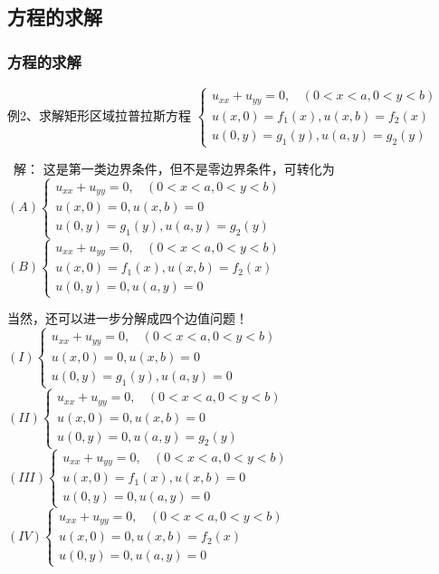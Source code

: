 \subsection{方程的求解}
\begin{frame}
	\frametitle{方程的求解}
	\begin{exampleblock} {例2、求解矩形区域拉普拉斯方程}
		$\displaystyle \begin{cases}
			u_{xx} +u_{yy} =0 ,~~~~ (0<x<a, 0<y<b)\\
			u(x,0)= f_1 (x) ,  u(x,b)= f_2 (x) \\
			u(0,y)= g_1 (y) ,  u(a,y)= g_2 (y) 
		\end{cases}$ \\
	\end{exampleblock}	
	\alert{ 解：}	这是第一类边界条件，但不是零边界条件，可转化为 \\
	$\displaystyle (A) \begin{cases}
		u_{xx} +u_{yy} =0 ,~~~~ (0<x<a, 0<y<b)\\
		u(x,0)= 0,  u(x,b)= 0 \\
		u(0,y)= g_1 (y) ,  u(a,y)= g_2 (y) 
	\end{cases}$ \\
	$\displaystyle (B) \begin{cases}
		u_{xx} +u_{yy} =0 ,~~~~ (0<x<a, 0<y<b)\\
		u(x,0)= f_1 (x) ,  u(x,b)= f_2 (x) \\
		u(0,y)= 0,  u(a,y)= 0 
	\end{cases}$ \\
\end{frame}	

\begin{frame}
	当然，还可以进一步分解成四个边值问题！
	$\displaystyle  (I) \begin{cases}
		u_{xx} +u_{yy} =0 ,~~~~ (0<x<a, 0<y<b)\\
		u(x,0)= 0,  u(x,b)= 0 \\
		u(0,y)= g_1 (y) ,  u(a,y)= 0
	\end{cases}$ \\
	$\displaystyle (II)  \begin{cases}
		u_{xx} +u_{yy} =0 ,~~~~ (0<x<a, 0<y<b)\\
		u(x,0)= 0,  u(x,b)= 0 \\
		u(0,y)= 0,  u(a,y)= g_2 (y) 
	\end{cases}$ \\
	$\displaystyle  (III)  \begin{cases}
		u_{xx} +u_{yy} =0 ,~~~~ (0<x<a, 0<y<b)\\
		u(x,0)= f_1 (x) ,  u(x,b)= 0 \\
		u(0,y)= 0,  u(a,y)= 0 
	\end{cases}$ \\	
	$\displaystyle  (IV)  \begin{cases}
		u_{xx} +u_{yy} =0 ,~~~~ (0<x<a, 0<y<b)\\
		u(x,0)= 0,  u(x,b)= f_2 (x) \\
		u(0,y)= 0,  u(a,y)= 0 
	\end{cases}$ \\	
\end{frame}		

